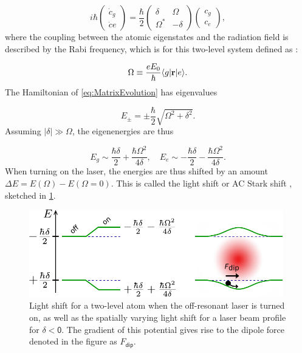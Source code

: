 \begin{equation}\label{eq:MatrixEvolution}
	i \hbar \begin{pmatrix}
		\dot{c}_g \\ 
		\dot{c}e
	\end{pmatrix}
	= \frac{\hbar}{2} \begin{pmatrix}
		\delta & \Omega \\ \Omega^* & -\delta 
	\end{pmatrix} 
	\begin{pmatrix}
		c_g \\ c_e
	\end{pmatrix},
\end{equation}
where the coupling between the atomic eigenstates and the radiation field is described by the Rabi frequency, which is for this two-level system defined as \cite{Metcalf1999}:

\begin{equation}\label{eq:RabiFrequencyMain}
	\Omega \equiv \frac{e E_0}{\hbar} \langle g\rvert\mathbf{r}\lvert e\rangle.
\end{equation}
The Hamiltonian of \cref{eq:MatrixEvolution} has eigenvalues 

\begin{equation}\label{eq:EigenValues}
	E_{\pm} = \pm
	\frac{\hbar}{2} \sqrt{\Omega^2+\delta^2}.
\end{equation}
Assuming $|\delta| \gg \Omega$, the eigenenergies are thus 

\begin{equation}\label{eq:SemiClassicalEigenvalues}
	E_g \sim  \frac{\hbar \delta}{2} +\frac{\hbar \Omega^2}{4 \delta}, \quad
	E_e \sim -\frac{\hbar \delta}{2} -\frac{\hbar \Omega^2}{4 \delta}.
\end{equation}
When turning on the laser, the energies are thus shifted by an amount $\Delta E = E(\Omega)-E(\Omega=0)$. 
This is called the light shift or AC Stark shift \cite{Metcalf1999}, sketched in \cref{fig:DipoleForce}.

\begin{figure}
    \centering
	\includegraphics[height=3.8cm]{figures/LightShift.pdf}
	\caption{Light shift for a two-level atom when the off-resonant laser is turned on, as well as the spatially varying light shift for a laser beam profile for $\mathsf{\delta<0}$. 
	The gradient of this potential gives rise to the dipole force denoted in the figure as $\mathsf{\textit{F}_{\text{dip}}}$.}
	\label{fig:DipoleForce}
\end{figure}


